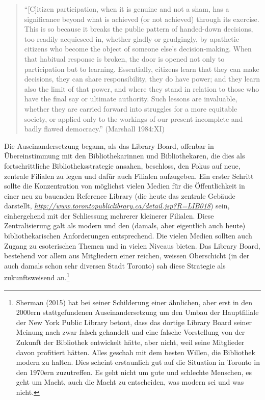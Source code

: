 \documentclass[a4paper,
fontsize=11pt,
oneside,
numbers=noperiodatend,
parskip=half-,
bibliography=totoc,
final
]{scrartcl}
\begin{document}
\begin{quote}
\enquote{{[}C{]}itizen participation, when it is genuine and not a sham,
has a significance beyond what is achieved (or not achieved) through its
exercise. This is so because it breaks the public pattern of handed-down
decisions, too readily acquiesced in, whether gladly or grudgingly, by
apathetic citizens who become the object of someone else's
decision-making. When that habitual response is broken, the door is
opened not only to participation but to learning. Essentially, citizens
learn that they can make decisions, they can share responsibility, they
do have power; and they learn also the limit of that power, and where
they stand in relation to those who have the final say or ultimate
authority. Such lessons are invaluable, whether they are carried forward
into struggles for a more equitable society, or applied only to the
workings of our present incomplete and badly flawed democracy.}
(Marshall 1984:XI)
\end{quote}

Die Auseinandersetzung begann, als das Library Board, offenbar in
Übereinstimmung mit den Bibliothekarinnen und Bibliothekaren, die dies
als fortschrittliche Bibliotheksstrategie ansahen, beschloss, den Fokus
auf neue, zentrale Filialen zu legen und dafür auch Filialen aufzugeben.
Ein erster Schritt sollte die Konzentration von möglichst vielen Medien
für die Öffentlichkeit in einer neu zu bauenden Reference Library (die
heute das zentrale Gebäude darstellt,
\href{http://www.torontopubliclibrary.ca/detail.jsp?R=LIB018}{\emph{http://www.torontopubliclibrary.ca/detail.jsp?R=LIB018}})
sein, einhergehend mit der Schliessung mehrerer kleinerer Filialen.
Diese Zentralisierung galt als modern und den (damals, aber eigentlich
auch heute) bibliothekarischen Anforderungen entsprechend. Die vielen
Medien sollten auch Zugang zu esoterischen Themen und in vielen Niveaus
bieten. Das Library Board, bestehend vor allem aus Mitgliedern einer
reichen, weissen Oberschicht (in der auch damals schon sehr diversen
Stadt Toronto) sah diese Strategie als zukunftsweisend an.\footnote{Sherman
  (2015) hat bei seiner Schilderung einer ähnlichen, aber erst in den
  2000ern stattgefundenen Auseinandersetzung um den Umbau der
  Hauptfiliale der New York Public Library betont, dass das dortige
  Library Board seiner Meinung nach zwar falsch gehandelt und eine
  falsche Vorstellung von der Zukunft der Bibliothek entwickelt hätte,
  aber nicht, weil seine Mitglieder davon profitiert hätten. Alles
  geschah mit dem besten Willen, die Bibliothek modern zu halten. Dies
  scheint erstaunlich gut auf die Situation in Toronto in den 1970ern
  zuzutreffen. Es geht nicht um gute und schlechte Menschen, es geht um
  Macht, auch die Macht zu entscheiden, was modern sei und was nicht.}
\end{document}
